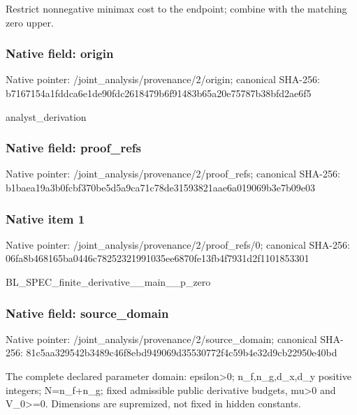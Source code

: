 \documentclass[10pt,a4paper]{article}
\begin{document}
\begingroup\raggedright\sloppy Restrict nonnegative minimax cost to the endpoint;\allowbreak{} combine with the matching zero upper.\par\endgroup

\subsubsection{Native field: origin}
Native pointer: /joint\_\allowbreak{}analysis/provenance/2/origin; canonical SHA-256: b7167154a1fddca6e1de90fdc2618479b6f91483b65a20e75787b38bfd2ae6f5

\begingroup\raggedright\sloppy analyst\_\allowbreak{}derivation\par\endgroup

\subsubsection{Native field: proof\_\allowbreak{}refs}
Native pointer: /joint\_\allowbreak{}analysis/provenance/2/proof\_\allowbreak{}refs; canonical SHA-256: b1baea19a3b0fcbf370be5d5a9ca71c78de31593821aae6a019069b3e7b09e03

\subsubsection{Native item 1}
Native pointer: /joint\_\allowbreak{}analysis/provenance/2/proof\_\allowbreak{}refs/0; canonical SHA-256: 06fa8b468165ba0446c78252321991035ee6870fe13fb4f7931d2f1101853301

\begingroup\raggedright\sloppy BL\_\allowbreak{}SPEC\_\allowbreak{}finite\_\allowbreak{}derivative\_\allowbreak{}\_\allowbreak{}main\_\allowbreak{}\_\allowbreak{}p\_\allowbreak{}zero\par\endgroup

\subsubsection{Native field: source\_\allowbreak{}domain}
Native pointer: /joint\_\allowbreak{}analysis/provenance/2/source\_\allowbreak{}domain; canonical SHA-256: 81c5aa329542b3489c46f8ebd949069d35530772f4c59b4e32d9cb22950e40bd

\begingroup\raggedright\sloppy The complete declared parameter domain:\allowbreak{} epsilon>0;\allowbreak{} n\_\allowbreak{}f,\allowbreak{}n\_\allowbreak{}g,\allowbreak{}d\_\allowbreak{}x,\allowbreak{}d\_\allowbreak{}y positive integers;\allowbreak{} N=\allowbreak{}n\_\allowbreak{}f+n\_\allowbreak{}g;\allowbreak{} fixed admissible public derivative budgets,\allowbreak{} mu>0 and V\_\allowbreak{}0>=\allowbreak{}0. Dimensions are supremized,\allowbreak{} not fixed in hidden constants.\par\endgroup
\end{document}
